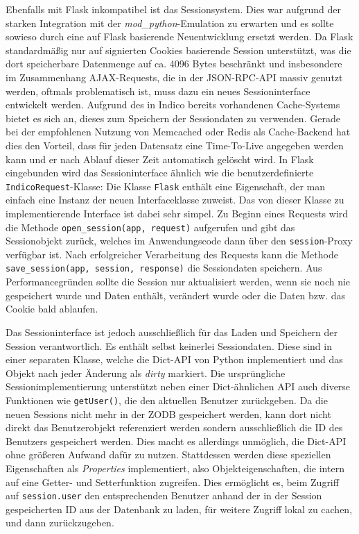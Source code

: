 Ebenfalls mit Flask inkompatibel ist das Sessionsystem. Dies war aufgrund der starken Integration
mit der \emph{mod\_python}-Emulation zu erwarten und es sollte sowieso durch eine auf Flask
basierende Neuentwicklung ersetzt werden. Da Flask standardmäßig nur auf signierten Cookies
basierende Session unterstützt, was die dort speicherbare Datenmenge auf ca. 4096 Bytes beschränkt
und insbesondere im Zusammenhang AJAX-Requests, die in der JSON-RPC-API massiv genutzt werden,
oftmals problematisch ist, muss dazu ein neues Sessioninterface entwickelt werden. Aufgrund des in
Indico bereits vorhandenen Cache-Systems bietet es sich an, dieses zum Speichern der Sessiondaten zu
verwenden. Gerade bei der empfohlenen Nutzung von Memcached oder Redis als Cache-Backend hat dies
den Vorteil, dass für jeden Datensatz eine Time-To-Live angegeben werden kann und er nach Ablauf
dieser Zeit automatisch gelöscht wird. In Flask eingebunden wird das Sessioninterface ähnlich wie
die benutzerdefinierte \lstinline{IndicoRequest}-Klasse: Die Klasse \lstinline{Flask} enthält eine
Eigenschaft, der man einfach eine Instanz der neuen Interfaceklasse zuweist. Das von dieser Klasse
zu implementierende Interface ist dabei sehr simpel. Zu Beginn eines Requests wird die Methode
\lstinline{open_session(app, request)} aufgerufen und gibt das Sessionobjekt zurück, welches im
Anwendungscode dann über den \lstinline{session}-Proxy verfügbar ist. Nach erfolgreicher
Verarbeitung des Requests kann die Methode \lstinline{save_session(app, session, response)} die
Sessiondaten speichern. Aus Performancegründen sollte die Session nur aktualisiert werden, wenn sie
noch nie gespeichert wurde und Daten enthält, verändert wurde oder die Daten bzw. das Cookie bald
ablaufen.

Das Sessioninterface ist jedoch ausschließlich für das Laden und Speichern der Session
verantwortlich. Es enthält selbst keinerlei Sessiondaten. Diese sind in einer separaten Klasse,
welche die Dict-API von Python implementiert und das Objekt nach jeder Änderung als \emph{dirty}
markiert. Die ursprüngliche Sessionimplementierung unterstützt neben einer Dict-ähnlichen API auch
diverse Funktionen wie \lstinline{getUser()}, die den aktuellen Benutzer zurückgeben. Da die neuen
Sessions nicht mehr in der ZODB gespeichert werden, kann dort nicht direkt das Benutzerobjekt
referenziert werden sondern ausschließlich die ID des Benutzers gespeichert werden. Dies macht es
allerdings unmöglich, die Dict-API ohne größeren Aufwand dafür zu nutzen. Stattdessen werden diese
speziellen Eigenschaften als \emph{Properties} implementiert, also Objekteigenschaften, die intern
auf eine Getter- und Setterfunktion zugreifen. Dies ermöglicht es, beim Zugriff auf
\lstinline{session.user} den entsprechenden Benutzer anhand der in der Session gespeicherten ID aus
der Datenbank zu laden, für weitere Zugriff lokal zu cachen, und dann zurückzugeben.

